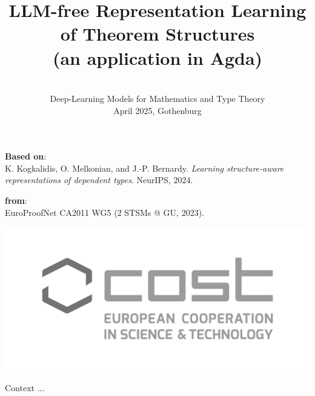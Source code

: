 \documentclass[aspectratio=169]{beamer}
\title{LLM-free Representation Learning of Theorem Structures\\
\smaller (an application in Agda)
}
\date{%
	\vspace{-2em}\\
	Deep-Learning Models for Mathematics and Type Theory\\
	April 2025, Gothenburg
	\vspace{6em}
}
\author{\light{Konstantinos Kogkalidis}}
\begin{document}
\maketitle

\begin{frame}{}
	\smaller
	\vspace{6em}
	\textbf{Based on}:\\
	K. Kogkalidis, O. Melkonian, and J.-P. Bernardy. \textit{Learning structure-aware representations of
dependent types}. NeurIPS, 2024.

	\vspace{2em}
	\textbf{ from}:\\
	EuroProofNet CA2011 WG5 (2 STSMs @ GU, 2023).
	
	\vspace{8em}
	\begin{flushright}
	\includegraphics[height=0.085\textwidth]{cost.pdf}\hspace{1.5em}
	\end{flushright}
\end{frame}

\begin{frame}{Context}
	\smaller
	...
\end{frame}
\end{document}
